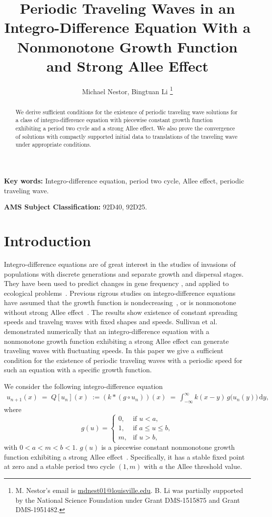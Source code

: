 \documentclass[11pt]{article}
\title{Periodic Traveling Waves in an Integro-Difference Equation With a Nonmonotone Growth Function and Strong Allee Effect}
\author{Michael Nestor, Bingtuan Li
\thanks{M. Nestor's email is \href{mailto:mdnest01@louisville.edu}{mdnest01@louisville.edu}. B. Li was partially supported by the National Science Foundation under Grant DMS-1515875 and Grant DMS-1951482.}}
\affil{Department of Mathematics, University of Louisville, \newline Louisville, KY 40292.}
\theoremstyle{definition}
\numberwithin{equation}{section}
\numberwithin{thm}{section}
\begin{document}
\maketitle


\begin{abstract}
We derive sufficient conditions for the existence of periodic traveling wave solutions for a class of integro-difference equation with piecewise constant growth function exhibiting a period two cycle and a strong Allee effect. We also prove the convergence of solutions with compactly supported initial data to translations of the traveling wave under appropriate conditions. 
\end{abstract}


{\bf Key words:} Integro-difference equation, period two cycle, Allee effect, periodic traveling wave.
\newline

{\bf AMS Subject Classification:} 92D40, 92D25.


\section{Introduction}

Integro-difference equations are of great interest in the studies of invasions of populations with discrete generations and separate growth and dispersal stages. They have been used to predict changes in gene frequency \cite{lui82a, lui82b, lui83, slatkin, w78}, and applied to ecological problems~\cite{hh, ks, kot89, kot92, kotbook, lut, nkl,otto}. Previous rigrous studies on integro-difference equations have assumed that the growth function is nondecreasing~\cite{w78, wein82}, or  is nonmonotone without strong Allee effect~\cite{lui83, wang}. The results show existence of constant spreading speeds and travelng waves with fixed shapes and speeds.   Sullivan et al. ~\cite{pnas} demonstrated numerically  that an integro-difference equation with a nonmonotone growth function exhibiting  a strong Allee effect can generate traveling waves with fluctuating speeds. In this paper we give a sufficient condition for the existence of periodic traveling waves with a periodic speed for such an equation with a specific growth function.


We consider the following integro-difference equation
\begin{align}\label{q}
u_{n+1}(x)\;=\;Q[u_n](x)\;:=(k*(g\circ u_n))(x)\;=\,\int^{\infty}_{-\infty}k(x-y)\,g\big(u_n(y)\big)\,\mathrm{d}y,
\end{align}
where 
\begin{equation} \label{g}
g(u) = \begin{cases}
0, & \text{if } u < a, \\
1, & \text{if } a \leq u \leq b, \\
m, & \text{if } u > b,
\end{cases}
\end{equation}
with $0<a<m<b<1$. $g(u)$ is a piecewise constant nonmonotone growth function exhibiting a strong Allee effect~\cite{all}. Specifically, it has a stable fixed point at zero and a stable period two cycle $(1,m)$ with $a$ the Allee threshold value.
\end{document}
